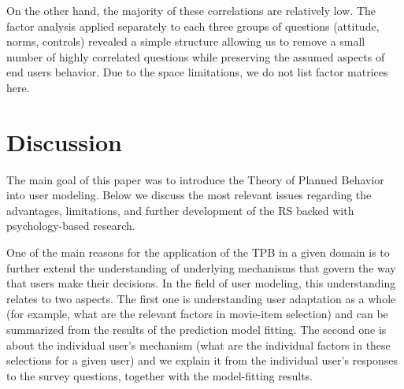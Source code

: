 \documentclass{llncs}
\begin{document}
On the other hand, the majority of these correlations are relatively low. The factor analysis applied separately to each three groups of questions (attitude, norms, controls) revealed a simple structure allowing us to remove a small number of highly correlated questions while preserving the assumed aspects of end users behavior. Due to the space limitations, we do not list factor matrices here.


\section{Discussion}\label{Sec_Disc}

The main goal of this paper was to introduce the Theory of Planned Behavior into user modeling. %
Below we discuss the most relevant issues regarding the advantages, limitations, and further development of the RS backed with psychology-based research. 

\vspace{0.6em}
 One of the main reasons for the application of the TPB in a given domain is to further extend the understanding of underlying mechanisms that govern the way that users make their decisions. In the field of user modeling, this understanding relates to two aspects. The first one is understanding user adaptation as a whole (for example, what are the relevant factors in movie-item selection) and can be summarized from the results of the prediction model fitting. The second one is about the individual user’s mechanism (what are the individual factors in these selections for a given user) and we explain it from the individual user’s responses to the survey questions, together with the model-fitting results.

\end{document}
